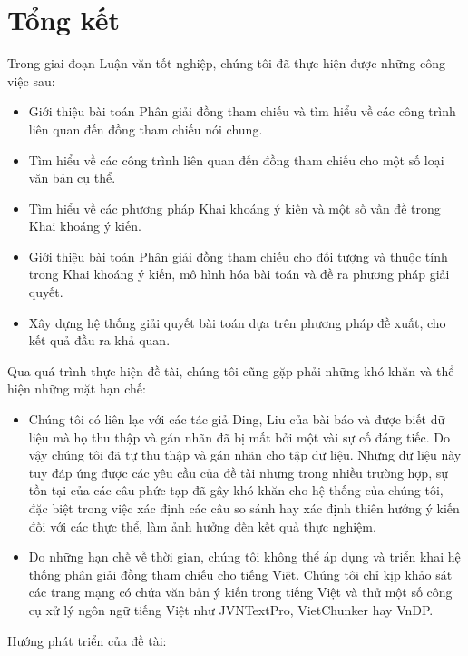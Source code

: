 \documentclass[12pt]{report}
\begin{document}
	\chapter{Tổng kết}			
		\par Trong giai đoạn Luận văn tốt nghiệp, chúng tôi đã thực hiện được những công việc sau:
		\begin{itemize}
			\item{Giới thiệu bài toán Phân giải đồng tham chiếu và tìm hiểu về các công trình liên quan đến đồng tham chiếu nói chung.}
			\item{Tìm hiểu về các công trình liên quan đến đồng tham chiếu cho một số loại văn bản cụ thể.}
			\item{Tìm hiểu về các phương pháp Khai khoáng ý kiến và một số vấn đề trong Khai khoáng ý kiến.}
			\item{Giới thiệu bài toán Phân giải đồng tham chiếu cho đối tượng và thuộc tính trong Khai khoáng ý kiến, mô hình hóa bài toán và đề ra phương pháp giải quyết.}
			\item{Xây dựng hệ thống giải quyết bài toán dựa trên phương pháp đề xuất, cho kết quả đầu ra khả quan.}
		\end{itemize}
		\par Qua quá trình thực hiện đề tài, chúng tôi cũng gặp phải những khó khăn và thể hiện những mặt hạn chế:
			\begin{itemize}
				\item{Chúng tôi có liên lạc với các tác giả Ding, Liu của bài báo \cite{mainpaper} và được biết dữ liệu mà họ thu thập và gán nhãn đã bị mất bởi một vài sự cố đáng tiếc. Do vậy chúng tôi đã tự thu thập và gán nhãn cho tập dữ liệu. Những dữ liệu này tuy đáp ứng được các yêu cầu của đề tài nhưng trong nhiều trường hợp, sự tồn tại của các câu phức tạp đã gây khó khăn cho hệ thống của chúng tôi, đặc biệt trong việc xác định các câu so sánh hay xác định thiên hướng ý kiến đối với các thực thể, làm ảnh hưởng đến kết quả thực nghiệm.}
				\item{Do những hạn chế về thời gian, chúng tôi không thể áp dụng và triển khai hệ thống phân giải đồng tham chiếu cho tiếng Việt. Chúng tôi chỉ kịp khảo sát các trang mạng có chứa văn bản ý kiến trong tiếng Việt và thử một số công cụ xử lý ngôn ngữ tiếng Việt như JVNTextPro, VietChunker hay VnDP.}
			\end{itemize}	
		\par Hướng phát triển của đề tài:
\end{document}
